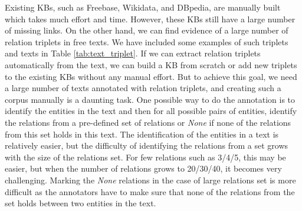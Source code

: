 Existing KBs, such as Freebase, Wikidata, and DBpedia, are manually built which takes much effort and time. However, these KBs still have a large number of missing links. On the other hand, we can find evidence of a large number of relation triplets in free texts. We have included some examples of such triplets and texts in Table \ref{tab:text_triplet}. If we can extract relation triplets automatically from the text, we can build a KB from scratch or add new triplets to the existing KBs without any manual effort. But to achieve this goal, we need a large number of texts annotated with relation triplets, and creating such a corpus manually is a daunting task. One possible way to do the annotation is to identify the entities in the text and then for all possible pairs of entities, identify the relations from a pre-defined set of relations or {\em None} if none of the relations from this set holds in this text. The identification of the entities in a text is relatively easier, but the difficulty of identifying the relations from a set grows with the size of the relations set. For few relations such as 3/4/5, this may be easier, but when the number of relations grows to 20/30/40, it becomes very challenging. Marking the {\em None} relations in the case of large relations set is more difficult as the annotators have to make sure that none of the relations from the set holds between two entities in the text.
